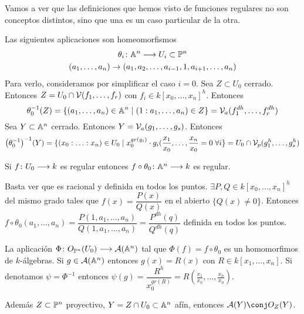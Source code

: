 \documentclass[ACGA.tex]{subfiles}
\begin{document}
\begin{prop}Vamos a ver que las definiciones que hemos visto de funciones regulares no son conceptos distintos, sino que una es un caso particular de la otra.
\end{prop}
\begin{dem}
\begin{lemma}
 Las siguientes aplicaciones son homeomorfismos
\begin{gather*} 
\theta_i \colon{\mathbb{A}^n}\longrightarrow{U_i\subset \mathbb{P}^n}\\
(a_1,\dotsc,a_n) \rightarrow (a_1,a_2,\dotsc,a_{i-1},1,a_{i+1},\dotsc,a_n)
\end{gather*}
Para verlo, consideramos por simplificar el caso $i=0$. Sea $Z\subset U_0$ cerrado. Entonces $Z=U_0\cap \mathcal{V}(f_1,\dotsc,f_r)$ con $f_i \in k[x_0,\dotsc,x_n]^h$. Entonces
$$
\theta_0^{-1}(Z) = \{(a_1,\dotsc,a_n)\in\mathbb{A}^n \mid (1:a_1,\dotsc,a_n)\in Z\} = \mathcal{V}_{a}(f_1^{dh},\dotsc,f_r^{dh})
$$
Sea $Y\subset \mathbb{A}^n$ cerrado. Entonces $Y=\mathcal{V}_{a}(g_1,\dotsc,g_s)$. Entonces
$$
{\left(\theta_0^{-1}\right)}^{-1}(Y) = \{(x_0:\dotsc:x_n)\in U_0 \mid x_0^{gr(g_i)}\cdot g_i(\frac{x_1}{x_0},\dotsc,\frac{x_n}{x_0}=0\;\forall i\} = U_0 \cap \mathcal{V}_{p}(g_1^h,\dotsc,g_s^h)
$$
\end{lemma}
\begin{lemma}Si $f\colon{U_0}\longrightarrow{k}$ es regular entonces $f \circ \theta_0\colon{\mathbb{A}^n}\longrightarrow{k}$ es regular. 

Basta ver que es racional y definida en todos los puntos. $\exists P,Q\in k[x_0,\dotsc,x_n]^h$ del mismo grado tales que $f(x)=\dfrac{P(x)}{Q(x)}$ en el abierto $\{Q(x)\neq 0\}$. Entonces $f\circ \theta_0 (a_1,\dotsc,a_n)= \dfrac{P(1,a_1,\dotsc,a_n)}{Q(1,a_1,\dotsc,a_n)} = \dfrac{P^{dh}(q)}{Q^{dh}(q)}$ definida en todos los puntos. 
\end{lemma}
La aplicación $\Phi \colon{ O_{\mathbb{P}^n}(U_0)}\longrightarrow{\mathcal{A}(\mathbb{A}^n)}$ tal que $\Phi(f) = f\circ \theta_0$ es un homomorfimos de $k$-álgebras. Si $g\in\mathcal{A}(\mathbb{A}^n)$ entonces $g(x)=R(x)$ con $R\in k[x_1,\dotsc,x_n]$. Si denotamos $\psi = \Phi^{-1}$ entonces $\psi(g) = \dfrac{R^h}{x_0^{gr(R)}}=R(\frac{x_1}{x_0},\dotsc,\frac{x_n}{x_0})$.

Además $Z\subset \mathbb{P}^n$ proyectivo, $Y=Z\cap U_0 \subset \mathbb{A}^n$ afín, entonces $\mathcal{A}(Y)\conj O_Z(Y)$.
\end{dem}
\end{document}
